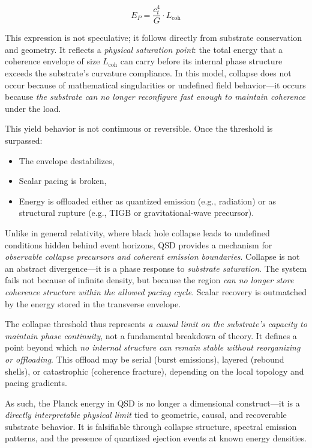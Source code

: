 \documentclass[entropy,article,submit,pdftex,moreauthors]{Definitions/mdpi}
\begin{document}
\begin{equation}
E_P = \frac{c_t^4}{G} \cdot L_{\text{coh}}
\end{equation}

This expression is not speculative; it follows directly from substrate conservation and geometry. It reflects a \textit{physical saturation point}: the total energy that a coherence envelope of size $L_{\text{coh}}$ can carry before its internal phase structure exceeds the substrate’s curvature compliance. In this model, collapse does not occur because of mathematical singularities or undefined field behavior---it occurs because \textit{the substrate can no longer reconfigure fast enough to maintain coherence} under the load.

This yield behavior is not continuous or reversible. Once the threshold is surpassed:
\begin{itemize}
  \item The envelope destabilizes,
  \item Scalar pacing is broken,
  \item Energy is offloaded either as quantized emission (e.g., radiation) or as structural rupture (e.g., TIGB or gravitational-wave precursor).
\end{itemize}

Unlike in general relativity, where black hole collapse leads to undefined conditions hidden behind event horizons, QSD provides a mechanism for \textit{observable collapse precursors and coherent emission boundaries}. Collapse is not an abstract divergence---it is a phase response to \textit{substrate saturation}. The system fails not because of infinite density, but because the region \textit{can no longer store coherence structure within the allowed pacing cycle}. Scalar recovery is outmatched by the energy stored in the transverse envelope.

The collapse threshold thus represents \textit{a causal limit on the substrate’s capacity to maintain phase continuity}, not a fundamental breakdown of theory. It defines a point beyond which \textit{no internal structure can remain stable without reorganizing or offloading}. This offload may be serial (burst emissions), layered (rebound shells), or catastrophic (coherence fracture), depending on the local topology and pacing gradients.

As such, the Planck energy in QSD is no longer a dimensional construct---it is a \textit{directly interpretable physical limit} tied to geometric, causal, and recoverable substrate behavior. It is falsifiable through collapse structure, spectral emission patterns, and the presence of quantized ejection events at known energy densities.
\end{document}
